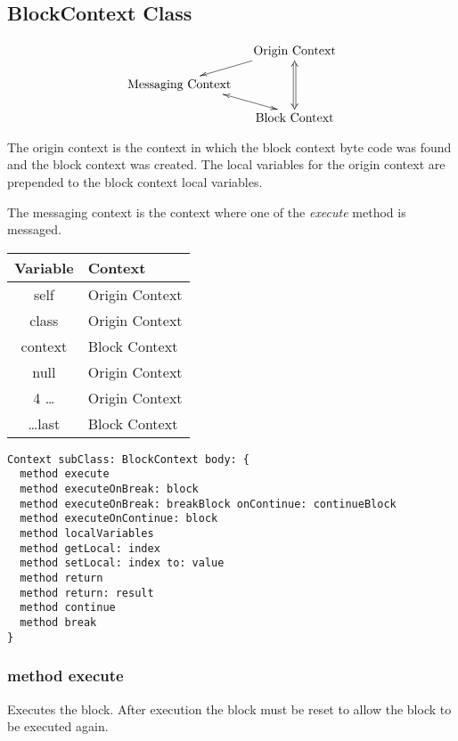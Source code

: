 \subsection {BlockContext Class}

\begin{displaymath}
  \xymatrix @-1pc {
    & \txt{Origin Context} \ar [dl] \ar@{<=>}[dd] \\
    \txt{Messaging Context} \ar@{<->}[dr] & \\
    & \txt{Block Context}\\
  }
\end{displaymath}

The origin context is the context in which the block context byte code was found and the block context was created. The local variables for the origin context are prepended to the block context local variables.

The messaging context is the context where one of the \textit{execute} method is messaged.

\begin{center}
  \begin{tabular}{ c | l }
  	Variable   & Context        \\ \hline
  	self       & Origin Context \\
  	class      & Origin Context \\
  	context    & Block Context  \\
  	null       & Origin Context \\
  	4 \dots    & Origin Context \\
  	\dots last & Block Context
  \end{tabular}
\end{center}


\begin{lstlisting}
Context subClass: BlockContext body: {
  method execute
  method executeOnBreak: block
  method executeOnBreak: breakBlock onContinue: continueBlock
  method executeOnContinue: block
  method localVariables
  method getLocal: index
  method setLocal: index to: value
  method return
  method return: result
  method continue
  method break
}
\end{lstlisting}

\subsubsection{method execute}
Executes the block. After execution the block must be reset to
allow the block to be executed again.

